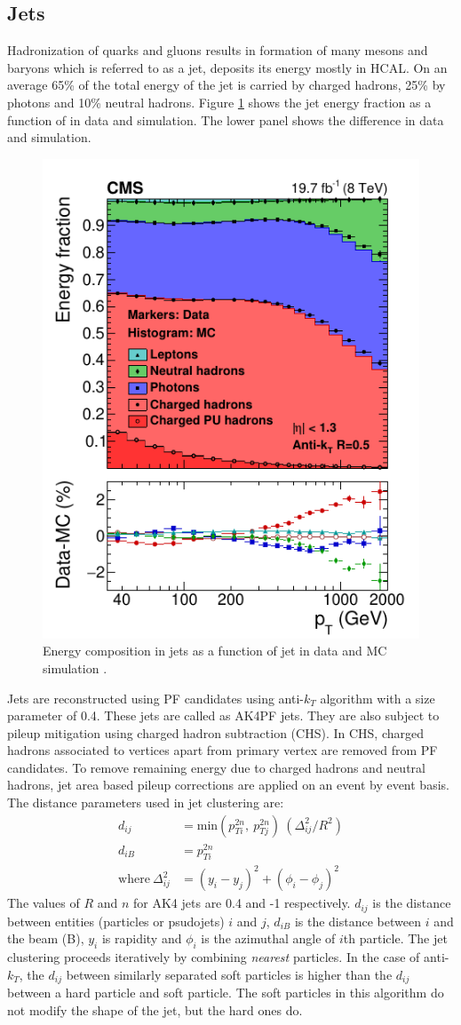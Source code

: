 \subsection{Jets}
Hadronization of quarks and gluons results in formation of many mesons and baryons which is referred to as a jet, deposits its energy mostly in HCAL. On an average 65\% of the total energy of the jet is carried by charged hadrons, 25\% by photons and 10\% neutral hadrons. Figure \ref{fig:JetEfrac} shows the jet energy fraction as a function of \pt in data and simulation. The lower panel shows the difference in data and simulation.
\begin{figure}[h!]
\centering
\includegraphics[width=0.5\linewidth]{../Figures/Chap2/JetEfrac}
\caption[Energy energy composition]{Energy composition in jets as a function of jet \pt in data and MC simulation \cite{CMS-PRF-14-001}.}
\label{fig:JetEfrac}
\end{figure}

Jets are reconstructed using PF candidates using anti-$k_T$ algorithm \cite{Cacciari:2008gp,Cacciari:2011ma} with a size parameter of 0.4. These jets are called as AK4PF jets. They are also subject to pileup mitigation using charged hadron subtraction (CHS). In CHS, charged hadrons associated to vertices apart from primary vertex are removed from PF candidates. To remove remaining energy due to charged hadrons and neutral hadrons, jet area based pileup corrections are applied on an event by event basis. The distance parameters used in jet clustering are:
\begin{align}
d_{ij} &= \mathrm{min}(p_{Ti}^{2n},\  p_{Tj}^{2n})\ (\Delta_{ij}^2/R^2)\\
d_{iB} &= p_{Ti}^{2n}\ \\ 
\mathrm{where\ } \Delta_{ij}^2 &= (y_i-y_j)^2 + (\phi_i - \phi_j)^2
\end{align}
The values of $R$ and $n$ for AK4 jets are 0.4 and -1 respectively. $d_{ij}$ is the distance between entities (particles or psudojets) $i$ and $j$, $d_{iB}$ is the distance between $i$ and the beam (B), $y_i$ is rapidity and $\phi_i$ is the azimuthal angle of $i$th particle. The jet clustering proceeds iteratively by combining \textit{nearest} particles. In the case of anti-$k_T$, the $d_{ij}$ between similarly separated soft particles is higher than the $d_{ij}$ between a hard particle and soft particle. The soft particles in this algorithm do not modify the shape of the jet, but the hard ones do.

